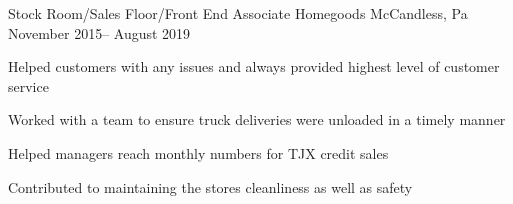 \documentclass[]{awesome-cv}
\begin{document}
\vspace{-2mm}
\begin{cventries}
	\cventry
	{Stock Room/Sales Floor/Front End Associate}
	{Homegoods}
	{McCandless, Pa}
	{November 2015– August 2019}
	{\begin{cvitems}
		\item {Helped customers with any issues and always provided highest level of customer service }
		\item {Worked with a team to ensure truck deliveries were unloaded in a timely manner}
		\item {Helped managers reach monthly numbers for TJX credit sales }
		\item {Contributed to maintaining the stores cleanliness as well as safety}
		\end{cvitems}}
\end{cventries}
\vspace{-4mm}
\end{document}
